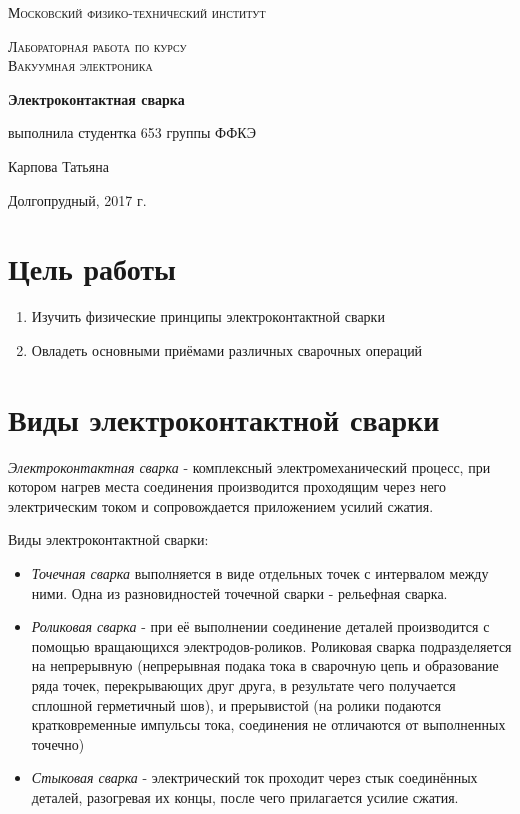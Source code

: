 \documentclass[12pt]{article}
\begin{document}
\begin{titlepage}
	\centering
	{\scshape\LARGE Московский физико-технический институт \par}
	\vspace{3cm}
	{\scshape\Large Лабораторная работа по курсу\\ Вакуумная электроника \par}
	\vspace{1cm}
	{\huge\bfseries Электроконтактная сварка \par}
	\vspace{1cm}
	\vfill
\begin{flushright}
	{\large выполнила студентка 653 группы ФФКЭ}\par
	\vspace{0.3cm}
	{\LARGE Карпова Татьяна} 
\end{flushright}

	\vfill

Долгопрудный, 2017 г.
\end{titlepage}

\newpage


\section{Цель работы}
\begin{enumerate}
    \item Изучить физические принципы электроконтактной сварки
    \item Овладеть основными приёмами различных сварочных операций
\end{enumerate}

\section{Виды электроконтактной сварки}
{\it Электроконтактная сварка} - комплексный электромеханический процесс, при котором нагрев места соединения производится проходящим через него электрическим током и сопровождается приложением усилий сжатия. \par 
Виды электроконтактной сварки:
\begin{itemize}
    \item {\it Точечная сварка} выполняется в виде отдельных точек с интервалом между ними. Одна из разновидностей точечной сварки - рельефная сварка.
    \item {\it Роликовая сварка} - при её выполнении соединение деталей производится с помощью вращающихся электродов-роликов. Роликовая сварка подразделяется на непрерывную (непрерывная подака тока в сварочную цепь и образование ряда точек, перекрывающих друг друга, в результате чего получается сплошной герметичный шов), и прерывистой (на ролики подаются кратковременные импульсы тока, соединения не отличаются от выполненных точечно)
    \item {\it Стыковая сварка} - электрический ток проходит через стык соединённых деталей, разогревая их концы, после чего прилагается усилие сжатия.
\end{itemize}
\end{document}
